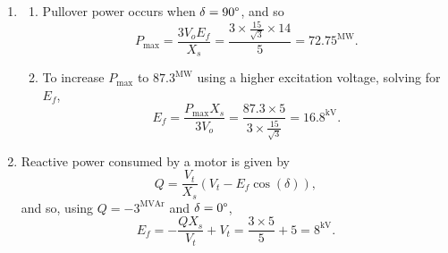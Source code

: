 \documentclass{article}
\begin{document}
\begin{enumerate}[label=\thesubsection]
\begin{enumerate}[label=\alph*)]
					\[
						Q_t = \frac{3V_t}{X_s}(E_f \cos{(\alpha)} - V_t) = \frac{3(65.43)}{9}(89.44\cos{(30.83\degree)} - 65.43) = 248^{\mathrm{MVAr}}.
					\]
			\end{enumerate}
			\setcounter{subsection}{19}
			\item
				\begin{enumerate}[label=\alph*)]
					\item Pullover power occurs when \(\delta = 90\degree\), and so 
						\[
							P_{\mathrm{max}} = \frac{3V_oE_f}{X_s} = \frac{3 \times \frac{15}{\sqrt{3}} \times 14}{5} = 72.75^{\mathrm{MW}}.
						\]
					\item To increase \(P_{\mathrm{max}}\) to \(87.3^{\mathrm{MW}}\) using a higher excitation voltage, solving for \(E_f\), 
						\[
							E_f = \frac{P_{\mathrm{max}}X_s}{3V_o} = \frac{87.3 \times 5}{3 \times \frac{15}{\sqrt{3}}} = 16.8^{\mathrm{kV}}.
						\]
		    \end{enumerate}
				\setcounter{subsection}{22}
			\item Reactive power consumed by a motor is given by
				\[
					Q = \frac{V_t}{X_s}(V_t - E_f\cos{(\delta)}), 
				\]
				and so, using \(Q = -3^{\mathrm{MVAr}}\) and \(\delta = 0\degree\),
				\[
					E_f = -\frac{Q X_s}{V_t} + V_t = \frac{3 \times 5}{5} + 5 = 8^{\mathrm{kV}}.
				\]
\end{enumerate}
\end{document}

